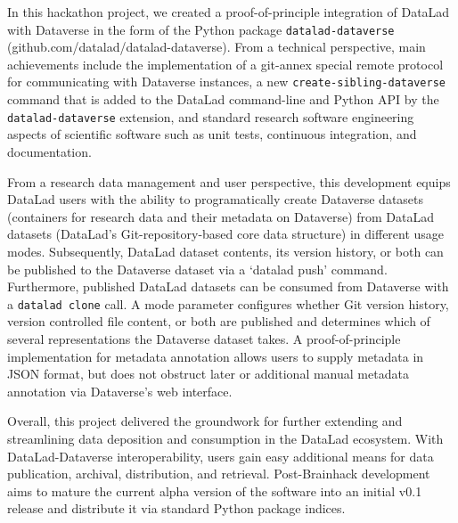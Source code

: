 \documentclass[../main.tex]{subfiles}
\begin{document}
In this hackathon project, we created a proof-of-principle integration of DataLad with Dataverse in the form of the Python package \texttt{datalad-dataverse} (github.com/datalad/datalad-dataverse). From a technical perspective, main achievements include the implementation of a git-annex special remote protocol for communicating with Dataverse instances, a new \texttt{create-sibling-dataverse} command that is added to the DataLad command-line and Python API by the \texttt{datalad-dataverse} extension, and standard research software engineering aspects of scientific software such as unit tests, continuous integration, and documentation.

From a research data management and user perspective, this development equips DataLad users with the ability to programatically create Dataverse datasets (containers for research data and their metadata on Dataverse) from DataLad datasets (DataLad’s Git-repository-based core data structure) in different usage modes. Subsequently, DataLad dataset contents, its version history, or both can be published to the Dataverse dataset via a ‘datalad push’ command. Furthermore, published DataLad datasets can be consumed from Dataverse with a \texttt{datalad clone} call. A mode parameter configures whether Git version history, version controlled file content, or both are published and determines which of several representations the Dataverse dataset takes. A proof-of-principle implementation for metadata annotation allows users to supply metadata in JSON format, but does not obstruct later or additional manual metadata annotation via Dataverse’s web interface.

Overall, this project delivered the groundwork for further extending and streamlining data deposition and consumption in the DataLad ecosystem. With DataLad-Dataverse interoperability, users gain easy additional means for data publication, archival, distribution, and retrieval. Post-Brainhack development aims to mature the current alpha version of the software into an initial v0.1 release and distribute it via standard Python package indices.


\printbibliography
\end{document}

